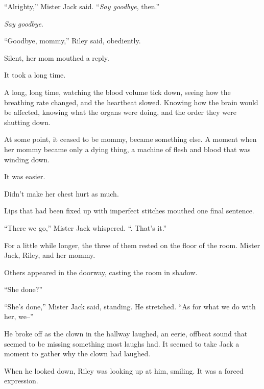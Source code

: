 ``Alrighty,'' Mister Jack said.  ``\emph{Say goodbye}, then.''



\emph{Say goodbye}.



``Goodbye, mommy,'' Riley said, obediently.



Silent, her mom mouthed a reply.



It took a long time.



A long, long time, watching the blood volume tick down, seeing how the breathing rate changed, and the heartbeat slowed.  Knowing how the brain would be affected, knowing what the organs were doing, and the order they were shutting down.



At some point, it ceased to be mommy, became something else.  A moment when her mommy became only a dying thing, a machine of flesh and blood that was winding down.



It was easier.



Didn't make her chest hurt as much.



Lips that had been fixed up with imperfect stitches mouthed one final sentence.



``There we go,'' Mister Jack whispered.  ``\ldotsThere.  That's it.''



For a little while longer, the three of them rested on the floor of the room.  Mister Jack, Riley, and her mommy.



Others appeared in the doorway, casting the room in shadow.



``She done?''



``She's done,'' Mister Jack said, standing.  He stretched.  ``As for what we do with her, we--''



He broke off as the clown in the hallway laughed, an eerie, offbeat sound that seemed to be missing something most laughs had.  It seemed to take Jack a moment to gather why the clown had laughed.



When he looked down, Riley was looking up at him, smiling.  It was a forced expression.



